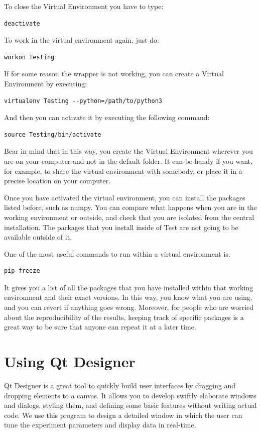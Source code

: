 To close the Virtual Environment you have to type:

\begin{verbatim}
deactivate
\end{verbatim}

To work in the virtual environment again, just do:
\begin{verbatim}
workon Testing
\end{verbatim}

If for some reason the wrapper is not working, you can create a Virtual Environment by executing:
\begin{verbatim}
virtualenv Testing --python=/path/to/python3
\end{verbatim}
And then you can activate it by executing the following command:
\begin{verbatim}
source Testing/bin/activate
\end{verbatim}

Bear in mind that in this way, you create the Virtual Environment wherever you are on your computer and not in the default folder. It can be handy if you want, for example, to share the virtual environment with somebody, or place it in a precise location on your computer.

Once you have activated the virtual environment, you can install the packages listed before, such as numpy. You can compare what happens when you are in the working environment or outside, and check that you are isolated from the central installation. The packages that you install inside of Test are not going to be available outside of it.

One of the most useful commands to run within a virtual environment is:

\begin{verbatim}
pip freeze
\end{verbatim}

It gives you a list of all the packages that you have installed within that working environment and their exact versions. In this way, you know what you are using, and you can revert if anything goes wrong. Moreover, for people who are worried about the reproducibility of the results, keeping track of specific packages is a great way to be sure that anyone can repeat it at a later time.

\section{Using Qt Designer}\label{sec:install-qt-designer}
Qt Designer is a great tool to quickly build user interfaces by dragging and dropping elements to a canvas. It allows you to develop swiftly elaborate windows and dialogs, styling them, and defining some basic features without writing actual code. We use this program to design a detailed window in which the user can tune the experiment parameters and display data in real-time.

